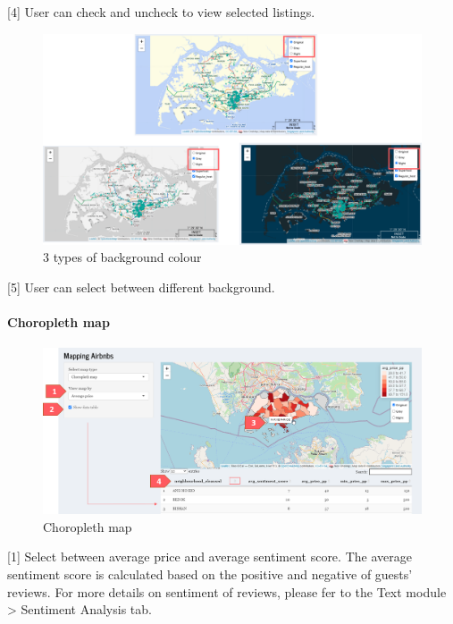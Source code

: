\documentclass[
  12pt,
]{article}
\begin{document}
{[}4{]} User can check and uncheck to view selected listings.

\begin{figure}[H]

{\centering \includegraphics[width=1\linewidth]{images/background} 

}

\caption{3 types of background colour}\label{fig:unnamed-chunk-8}
\end{figure}

{[}5{]} User can select between different background.

\hypertarget{choropleth-map}{%
\paragraph{Choropleth map}\label{choropleth-map}}

\begin{figure}[H]

{\centering \includegraphics[width=1\linewidth]{images/choro} 

}

\caption{Choropleth map}\label{fig:unnamed-chunk-9}
\end{figure}

{[}1{]} Select between average price and average sentiment score. The
average sentiment score is calculated based on the positive and negative
of guests' reviews. For more details on sentiment of reviews, please fer
to the Text module \textgreater{} Sentiment Analysis tab.
\end{document}
